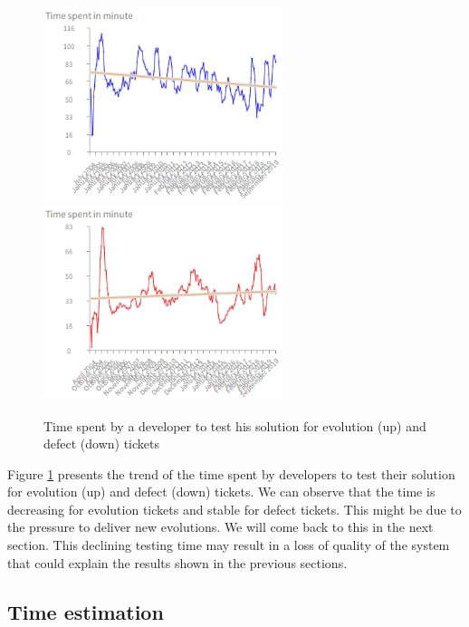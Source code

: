 \documentclass[10pt,conference]{IEEEtran}
\begin{document}
 \begin{figure}[htbp]
  \centering
  \includegraphics[width=70mm]{./images/evolutionTest.png} \\
  \includegraphics[width=70mm]{./images/timeDevTest.png}
  \caption{Time spent by a developer to test his solution for  evolution (up) and defect (down) tickets}
  \label{fig:devTimeTest}
\end{figure}

Figure \ref{fig:devTimeTest} presents the trend of the time spent by developers to test their solution for evolution (up) and defect (down) tickets.
We can observe that the time is decreasing for evolution tickets and stable for defect tickets. 
This might be due to the pressure to deliver new evolutions. We will come back to this in the next section.
This declining testing time may result in a loss of quality of the system that could explain the results shown in the previous sections.
 
\subsection{Time estimation}

\end{document}

